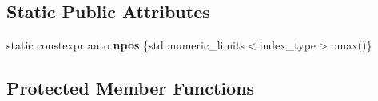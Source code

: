 \subsection*{Static Public Attributes}
\begin{DoxyCompactItemize}
\item 
\mbox{\label{classsequoia_1_1data__structures_1_1partition__impl_1_1partition__index__policy_a31665558623c0177cd2a93669a956f85}} 
static constexpr auto {\bfseries npos} \{std\+::numeric\+\_\+limits$<$index\+\_\+type$>$\+::max()\}
\end{DoxyCompactItemize}
\subsection*{Protected Member Functions}
